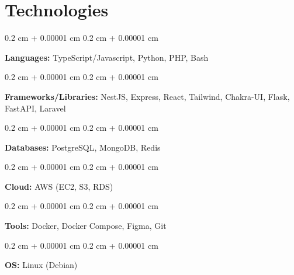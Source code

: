 \documentclass[10pt, letterpaper]{article}
\newenvironment{onecolentry}{
    \begin{adjustwidth}{
        0.2 cm + 0.00001 cm
    }{
        0.2 cm + 0.00001 cm
    }
}{
    \end{adjustwidth}
} %
\begin{document}
        \vspace{0.2 cm}



    
    \section{Technologies}



        
        \begin{onecolentry}
            \textbf{Languages:} TypeScript/Javascript, Python, PHP, Bash
        \end{onecolentry}

        \vspace{0.2 cm}

        \begin{onecolentry}
            \textbf{Frameworks/Libraries:} NestJS, Express, React, Tailwind, Chakra-UI, Flask, FastAPI, Laravel
        \end{onecolentry}

        \vspace{0.2 cm}
        
        \begin{onecolentry}
            \textbf{Databases:} PostgreSQL, MongoDB, Redis
        \end{onecolentry}

        \vspace{0.2 cm}
        
        \begin{onecolentry}
            \textbf{Cloud:} AWS (EC2, S3, RDS)
        \end{onecolentry}

        \vspace{0.2 cm}
        
        \begin{onecolentry}
            \textbf{Tools:} Docker, Docker Compose, Figma, Git
        \end{onecolentry}

        \vspace{0.2 cm}
        \begin{onecolentry}
            \textbf{OS:} Linux (Debian)
        \end{onecolentry}
\end{document}
